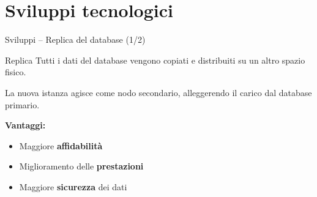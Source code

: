 \section{Sviluppi tecnologici}
\begin{frame}{Sviluppi – Replica del database (1/2)}
\begin{block}{Replica}
Tutti i dati del database vengono copiati e distribuiti su un altro spazio fisico. 

La nuova istanza agisce come nodo secondario, alleggerendo il carico dal database primario. 

\vspace{0.4cm}
\textbf{Vantaggi:}\vspace{0.1cm}
\begin{itemize}
  \item Maggiore \textbf{affidabilità}
  \item Miglioramento delle \textbf{prestazioni}
  \item Maggiore \textbf{sicurezza} dei dati
\end{itemize}\vspace{0.1cm}
\end{block}

\end{frame}

